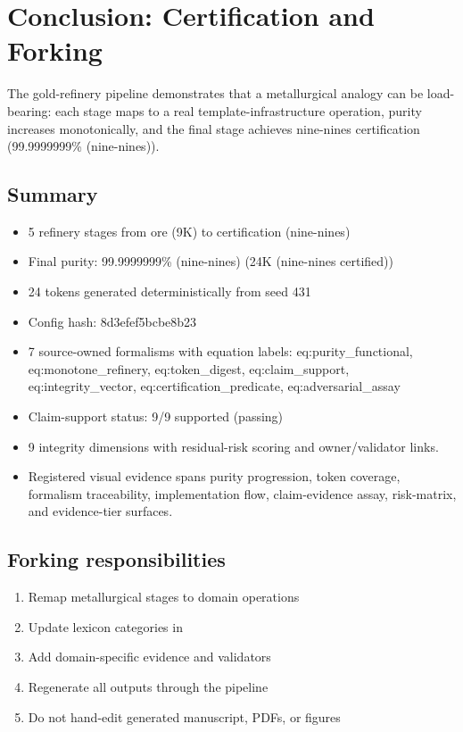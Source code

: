 \documentclass[
]{article}
\providecommand{\tightlist}{%
  \setlength{\itemsep}{0pt}\setlength{\parskip}{0pt}}
\begin{document}
\newpage

\section{Conclusion: Certification and Forking}\label{sec:conclusion}

The gold-refinery pipeline demonstrates that a metallurgical analogy can
be load-bearing: each stage maps to a real template-infrastructure
operation, purity increases monotonically, and the final stage achieves
nine-nines certification (99.9999999\% (nine-nines)).

\subsection{Summary}\label{summary}

\begin{itemize}
\tightlist
\item
  5 refinery stages from ore (9K) to certification (nine-nines)
\item
  Final purity: 99.9999999\% (nine-nines) (24K (nine-nines certified))
\item
  24 tokens generated deterministically from seed 431
\item
  Config hash: 8d3efef5bcbe8b23
\item
  7 source-owned formalisms with equation labels: eq:purity\_functional,
  eq:monotone\_refinery, eq:token\_digest, eq:claim\_support,
  eq:integrity\_vector, eq:certification\_predicate,
  eq:adversarial\_assay
\item
  Claim-support status: 9/9 supported (passing)
\item
  9 integrity dimensions with residual-risk scoring and owner/validator
  links.
\item
  Registered visual evidence spans purity progression, token coverage,
  formalism traceability, implementation flow, claim-evidence assay,
  risk-matrix, and evidence-tier surfaces.
\end{itemize}

\subsection{Forking responsibilities}\label{forking-responsibilities}

\begin{enumerate}
\def\labelenumi{\arabic{enumi}.}
\tightlist
\item
  Remap metallurgical stages to domain operations
\item
  Update lexicon categories in 
\item
  Add domain-specific evidence and validators
\item
  Regenerate all outputs through the pipeline
\item
  Do not hand-edit generated manuscript, PDFs, or figures
\end{enumerate}
\end{document}
